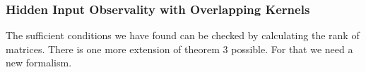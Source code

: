 \subsubsection{Hidden Input Observality with Overlapping Kernels}
The sufficient conditions we have found can be checked by calculating the rank of 
matrices. There is one more extension of theorem 3 possible. For that we need a new 
formalism.
